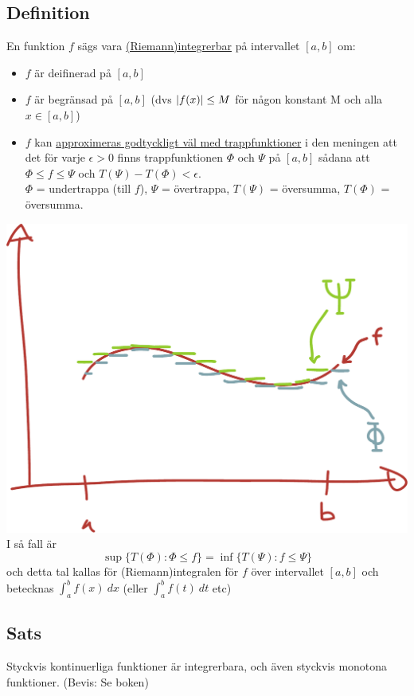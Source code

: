 \documentclass{article}
\begin{document}
\subsection{Definition}
En funktion $f$ sägs vara \uline{(Riemann)integrerbar} på intervallet $[a,b]$ om:

\begin{itemize}
  \item $f$ är deifinerad på $[a,b]$
  \item $f$ är begränsad på $[a,b]$ (dvs $\lvert f(x)\rvert\le M$ för någon konstant M och alla $x\in [a,b]$)
  \item $f$ kan \uline{approximeras godtyckligt väl med trappfunktioner} i den meningen att det för varje $\epsilon>0$
    finns trappfunktionen $\Phi$ och $\Psi$ på $[a,b]$ sådana att $\Phi\le f \le\Psi$ och $T(\Psi)-T(\Phi) < \epsilon$.\\
    $\Phi$ = undertrappa (till $f$), $\Psi$ = övertrappa, $T(\Psi)$ = översumma, $T(\Phi)$ = översumma.
\end{itemize}
\includegraphics[scale=0.25]{img/img3.pdf}\\

I så fall är
$$\sup\{T(\Phi) : \Phi \le f\} = \inf \{T(\Psi) : f\le \Psi\}$$
och detta tal kallas för (Riemann)integralen för $f$ över intervallet $[a,b]$ och betecknas
$\int^b_a{f(x)\ dx}$ (eller $\int^b_a{f(t)\ dt}$ etc)

\subsection{Sats}
Styckvis kontinuerliga funktioner är integrerbara,
och även styckvis monotona funktioner.
(Bevis: Se boken)
\end{document}
